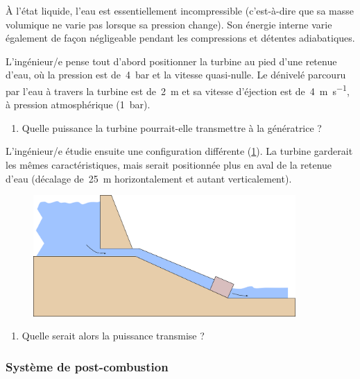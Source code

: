 	À l’état liquide, l’eau est essentiellement incompressible (c’est-à-dire que sa masse volumique ne varie pas lorsque sa pression change). Son énergie interne varie également de façon négligeable pendant les compressions et détentes adiabatiques.
	
	L’ingénieur/e pense tout d’abord positionner la turbine au pied d’une retenue d’eau, où la pression est de~\SI{4}{\bar} et la vitesse quasi-nulle. Le dénivelé parcouru par l’eau à travers la turbine est de~\SI{2}{\metre} et sa vitesse d’éjection est de~\SI{4}{\metre\per\second}, à pression atmosphérique (\SI{1}{\bar}).
	
	\begin{enumerate}
		\item Quelle puissance la turbine pourrait-elle transmettre à la génératrice ?
	\end{enumerate}

	L’ingénieur/e étudie ensuite une configuration différente (\cref{fig_water_turbine_2}). La turbine garderait les mêmes caractéristiques, mais serait positionnée plus en aval de la retenue d’eau (décalage de~\SI{25}{\metre} horizontalement et autant verticalement).
	
	\begin{figure}
		\begin{center}
			\includegraphics[width=10cm]{images/water_turbine_2.png}
		\end{center}
		\label{fig_water_turbine_2}
	\end{figure}

	\begin{enumerate}
		\item Quelle serait alors la puissance transmise ?
	\end{enumerate}


\subsubsection{Système de post-combustion}
\label{exo_postcombustion}


